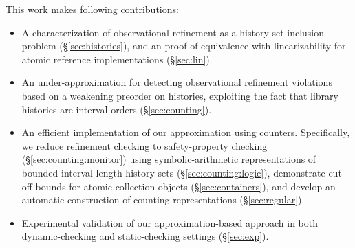 This work makes following contributions:
\begin{itemize}

  \item A characterization of observational refinement as a
  history-set-inclusion problem (\S\ref{sec:histories}), and an proof of
  equivalence with linearizability for atomic reference implementations
  (\S\ref{sec:lin}).

  \item An under-approximation for detecting observational refinement
  violations based on a weakening preorder on histories, exploiting the fact
  that library histories are interval orders (\S\ref{sec:counting}).

  \item An efficient implementation of our approximation using counters.
  Specifically, we reduce refinement checking to safety-property checking
  (\S\ref{sec:counting:monitor}) using symbolic-arithmetic representations of
  bounded-interval-length history sets (\S\ref{sec:counting:logic}),
  demonstrate cut-off bounds for atomic-collection objects
  (\S\ref{sec:containers}), and develop an automatic construction of counting
  representations (\S\ref{sec:regular}).

  \item Experimental validation of our approximation-based approach in both
  dynamic-checking and static-checking settings (\S\ref{sec:exp}).

\end{itemize}
